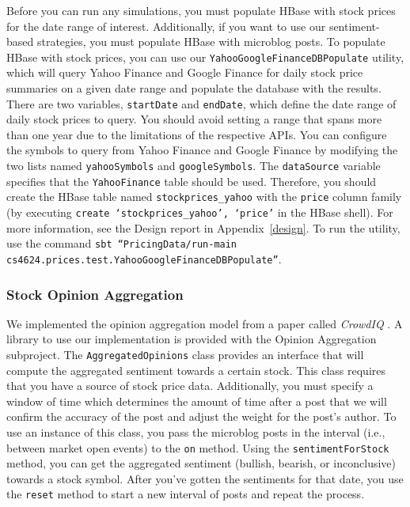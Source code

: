Before you can run any simulations, you must populate HBase with stock prices for the date range of interest.
Additionally, if you want to use our sentiment-based strategies, you must populate HBase with microblog posts.
To populate HBase with stock prices, you can use our \texttt{YahooGoogleFinance\-DBPopulate} utility, which will query Yahoo Finance and Google Finance for daily stock price summaries on a given date range and populate the database with the results.
There are two variables, \texttt{startDate} and \texttt{endDate}, which define the date range of daily stock prices to query.
You should avoid setting a range that spans more than one year due to the limitations of the respective APIs.
You can configure the symbols to query from Yahoo Finance and Google Finance by modifying the two lists named \texttt{yahooSymbols} and \texttt{googleSymbols}.
The \texttt{dataSource} variable specifies that the \texttt{YahooFinance} table should be used.
Therefore, you should create the HBase table named \texttt{stockprices\_yahoo} with the \texttt{price} column family (by executing \texttt{create `stockprices\_yahoo', `price'} in the HBase shell).
For more information, see the Design report in Appendix~\ref{design}.
To run the utility, use the command \texttt{sbt ``PricingData/run-main\\ cs4624.prices.test.YahooGoogleFinanceDBPopulate''}.

\subsubsection{Stock Opinion Aggregation}

We implemented the opinion aggregation model from a paper called \textit{CrowdIQ} \cite{crowdiq}.
A library to use our implementation is provided with the Opinion Aggregation subproject.
The \texttt{AggregatedOpinions} class provides an interface that will compute the aggregated sentiment towards a certain stock.
This class requires that you have a source of stock price data.
Additionally, you must specify a window of time which determines the amount of time after a post that we will confirm the accuracy of the post and adjust the weight for the post's author.
To use an instance of this class, you pass the microblog posts in the interval (i.e., between market open events) to the \texttt{on} method.
Using the \texttt{sentimentForStock} method, you can get the aggregated sentiment (bullish, bearish, or inconclusive) towards a stock symbol.
After you've gotten the sentiments for that date, you use the \texttt{reset} method to start a new interval of posts and repeat the process.

